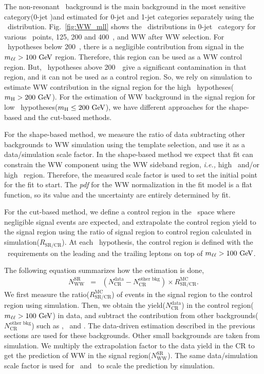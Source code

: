 The non-resonant \WW\ background is the main background in the most sensitive 
category(0-jet \DF)and estimated for 0-jet and 1-jet categories separately 
using the \mll\ distribution.
Fig.~\ref{fig:WW_mll} shows the \mll\ distributions in 0-jet \DF\ 
category for various \mHi\ points, 125, 200 and 400~\GeV, and WW after WW selection. 
For \mHi\ hypotheses below 200~\GeV, 
there is a negligible contribution from signal in the $m_{\ell\ell}>100~\mathrm{Ge\kern -0.1em V}$ region. 
Therefore, this region can be used as a WW control region.  
But, \mHi\ hypotheses above 200~\GeV\ give a significant contamination in that region,
and it can not be used as a control region. So, we rely on simulation
to estimate WW contribution in the signal region for the high \mHi\ hypotheses($m_{\mathrm{H}}>200~\mathrm{Ge\kern -0.1em V}$). 
For the estimation of WW background in the signal region 
for low \mHi\ hypotheses($m_{\mathrm{H}}\le200~\mathrm{Ge\kern -0.1em V}$), 
we have different approaches for the shape-based and the cut-based methods. 

For the shape-based method, we measure the ratio of data subtracting other backgrounds 
to WW simulation using the template selection, and use it as a data/simulation scale factor. 
In the shape-based method we expect that fit can constrain the WW component using 
the WW sideband region, \textit{i.e.,} high \mT\ and/or high \mll\ region. Therefore,   
the measured scale factor is used to set the initial point for the fit to start. 
The \textit{pdf} for the WW normalization in the fit model is a flat function, 
so its value and the uncertainty are entirely determined by fit. 

For the cut-based method, we define a control region in the \mll\ space where 
negligible signal events are expected, and extrapolate the control region yield 
to the signal region using the ratio of signal region to control region calculated 
in simulation($R_{\textrm{SR/CR}}$). 
At each \mHi\ hypothesis, the control region is defined with the \pt\ requirements 
on the leading and the trailing leptons on top of $m_{\ell\ell}>100~\mathrm{Ge\kern -0.1em V}$. 

The following equation summarizes how the estimation is done, 
\begin{eqnarray} 
N_{\textrm{WW}}^{\textrm{SR}} 
&=&  
\left( N_{\textrm{CR}}^{\textrm{data}}  
     - N_{\textrm{CR}}^{\textrm{other bkg}}\right) \times R_\textrm{SR/CR}^{\textrm{MC}}.  
\end{eqnarray} 
We first measure the ratio($R_\textrm{SR/CR}^{\textrm{MC}}$) of events in the signal region 
to the control region using simulation.  
Then, we obtain the yield($N_{\textrm{CR}}^{\textrm{data}}$) in the 
control region($m_{\ell\ell}>100~\mathrm{Ge\kern -0.1em V}$) in data, and subtract the contribution from other 
backgrounds($N_{\textrm{CR}}^{\textrm{other bkg}}$) such as \topbkg, \Wjets\ and \dyll.  
The data-driven estimation described in the previous sections are used for 
these backgrounds. Other small backgrounds are taken from simulation. 
We multiply the extrapolation factor to the data yield in the CR 
to get the prediction of WW in the signal region($N_{\textrm{WW}}^{\textrm{SR}}$).
The same data/simulation scale factor is used for \qqww\ and \ggww\ to scale 
the prediction by simulation. 

